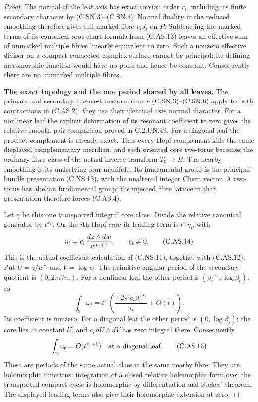\begin{proof}
The normal of the leaf axis has exact
torsion order $r_i$, including its finite
secondary character by (C.SN.3)--(C.SN.4).
Normal duality in the reduced smoothing
therefore gives full marked fibre $r_iJ_i$
on $P$. Subtracting the marked terms of
its canonical root-chart formula from
(C.AS.13) leaves an effective sum of
unmarked multiple fibres linearly
equivalent to zero. Such a nonzero
effective divisor on a compact connected
complex surface cannot be principal:
its defining meromorphic function would
have no poles and hence be constant.
Consequently there are no unmarked
multiple fibres.

\par\medskip\noindent\textbf{The exact topology and the one period shared by all leaves.}
The primary and secondary inverse-transform
charts (C.SN.3)--(C.SN.6) apply to both
contractions in (C.AS.2): they use their
identical axis normal character. For a
nonlinear leaf the explicit deformation
of its resonant coefficient to zero gives
the relative smooth-pair comparison
proved in C.2.UN.49. For a diagonal leaf
the product complement is already exact.
Thus every Hopf complement kills the
same displayed complementary meridian,
and each oriented core two-torus becomes
the ordinary fibre class of the actual
inverse transform $T_0\to B$.
The nearby smoothing is its underlying
four-manifold. Its fundamental group is
the principal-bundle presentation
(C.NS.13), with the unaltered integer
Chern vector. A two-torus has abelian
fundamental group; the injected fibre
lattice in that presentation therefore
forces (C.AS.4).

Let $\gamma$ be this one transported
integral core class. Divide the relative
canonical generator by $t^{k_P}$.
On the $i$th Hopf core its leading
term is $t^{r_i}\eta_i$, with
\[
                   \eta_i=c_i\,{dz\wedge dw\over w^{r_i+1}},
                          \qquad c_i\ne0.               \tag{C.AS.14}
\]
This is the actual coefficient calculation
of (C.NS.11), together with (C.AS.12).
Put $U=z/w^{r_i}$ and $V=\log w$.
The primitive angular period of the
secondary quotient is $(0,2\pi i/n_i)$.
For a nonlinear leaf the other period is
$(\beta_i^{-r_i},\log\beta_i)$, so
\[
       \int_{\gamma}\omega_t
          =t^{r_i}\left(\frac{\pm2\pi i c_i\beta_i^{-r_i}}{n_i}
                         +O(t)\right).                 \tag{C.AS.15}
\]
Its coefficient is nonzero. For a diagonal
leaf the other period is
$(0,\log\beta_i)$: the core lies at
constant $U$, and $c_i\,dU\wedge dV$
has zero integral there. Consequently
\[
                         \int_\gamma\omega_t=O(t^{r_i+1})
                  \quad\hbox{at a diagonal leaf}.        \tag{C.AS.16}
\]
These are periods of the same actual
class in the same nearby fibre. They
are holomorphic functions: integration
of a closed relative holomorphic form
over the transported compact cycle is
holomorphic by differentiation and
Stokes' theorem. The displayed leading
terms also give their holomorphic
extension at zero.


\end{proof}
